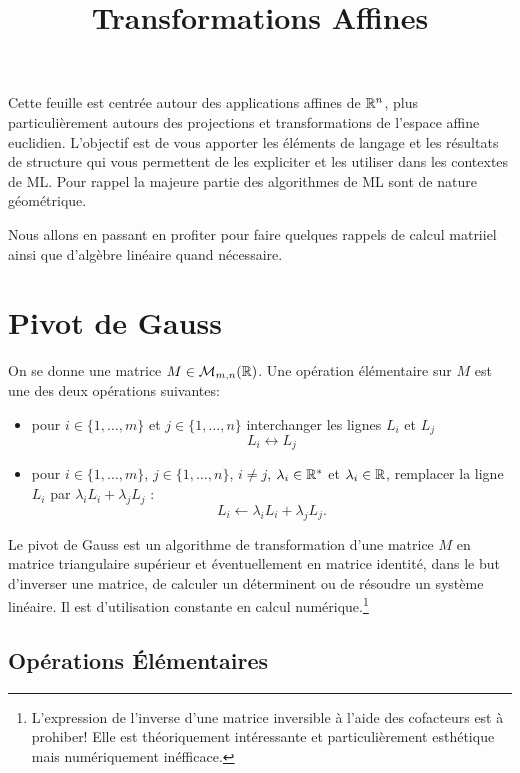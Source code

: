 \documentclass[11pt, a4paper]{article}
\title{%
  { \huge Transformations Affines}%
}
\author{}
\date{}
\begin{document}
\maketitle\thispagestyle{fancy}

Cette feuille est centrée autour des applications affines de $\mathbb{R}^n$,
plus particulièrement autours des projections et transformations de
l'espace affine euclidien. L'objectif est de vous apporter les
éléments de langage et les résultats de structure qui vous permettent
de les expliciter et les utiliser dans les contextes de ML. Pour
rappel la majeure partie des algorithmes de ML sont de nature
géométrique.

Nous allons en passant en profiter pour faire quelques rappels de
calcul matriiel ainsi que d'algèbre linéaire quand nécessaire.

\section{Pivot de Gauss}
\label{sec:pivotGauss}

On se donne une matrice $M \in \mathcal{M}_{m, n}(\mathbb{R})$. Une opération
élémentaire sur $M$ est une des deux opérations suivantes:
\begin{itemize}
\item[\textbullet]
  pour $i \in \{1, \ldots, m\}$ et $j \in \{1, \ldots, n\}$
  interchanger les lignes $L_i$ et $L_j$
  \[
  L_i \leftrightarrow L_j
  \]
\item[\textbullet]
  pour $i \in \{1, \ldots, m\}$, $j \in \{1, \ldots, n\}$, $i \neq j$,
  $\lambda_i \in \mathbb{R}^*$ et $\lambda_i \in \mathbb{R}$, remplacer la ligne $L_i$
  par $\lambda_i L_i + \lambda_jL_j$ :
  \[
  L_i \leftarrow \lambda_iL_i + \lambda_jL_j.
  \]
\end{itemize}
Le pivot de Gauss est un algorithme de transformation d'une matrice
$M$ en matrice triangulaire supérieur et éventuellement en matrice
identité, dans le but d'inverser une matrice, de calculer un
déterminent ou de résoudre un système linéaire. Il est d'utilisation
constante en calcul numérique.\footnote{L'expression de l'inverse
  d'une matrice inversible à l'aide des cofacteurs est à prohiber!
  Elle est théoriquement intéressante et particulièrement esthétique
  mais numériquement inéfficace.}

\subsection{Opérations Élémentaires}
\label{subsec:opElementaires}
\end{document}
